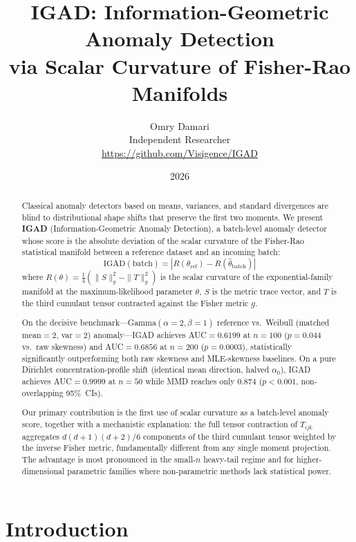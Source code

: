 \documentclass[12pt]{article}
\title{IGAD: Information-Geometric Anomaly Detection\\
       via Scalar Curvature of Fisher-Rao Manifolds}
\author{Omry Damari\\
        Independent Researcher\\
        \href{https://github.com/Visigence/IGAD}{https://github.com/Visigence/IGAD}}
\date{2026}
\begin{document}
\maketitle

\begin{abstract}
Classical anomaly detectors based on means, variances, and standard divergences
are blind to distributional shape shifts that preserve the first two moments.
We present \textbf{IGAD} (Information-Geometric Anomaly Detection), a
batch-level anomaly detector whose score is the absolute deviation of the scalar
curvature of the Fisher-Rao statistical manifold between a reference dataset and
an incoming batch:
\[
  \mathrm{IGAD}(\text{batch}) = |R(\theta_{\mathrm{ref}}) - R(\hat{\theta}_{\mathrm{batch}})|
\]
where $R(\theta) = \tfrac{1}{4}(\|S\|^2_g - \|T\|^2_g)$ is the scalar curvature
of the exponential-family manifold at the maximum-likelihood parameter $\theta$,
$S$ is the metric trace vector, and $T$ is the third cumulant tensor contracted
against the Fisher metric $g$.

On the decisive benchmark---Gamma$(\alpha{=}2,\beta{=}1)$ reference vs.\
Weibull (matched mean$=2$, var$=2$) anomaly---IGAD achieves AUC$=0.6199$ at
$n=100$ ($p=0.044$ vs.\ raw skewness) and AUC$=0.6856$ at $n=200$
($p=0.0003$), statistically significantly outperforming both raw skewness and
MLE-skewness baselines. On a pure Dirichlet concentration-profile shift
(identical mean direction, halved $\alpha_0$), IGAD achieves AUC$=0.9999$ at
$n=50$ while MMD reaches only $0.874$ ($p<0.001$, non-overlapping 95\%~CIs).

Our primary contribution is the first use of scalar curvature as a batch-level
anomaly score, together with a mechanistic explanation: the full tensor
contraction of $T_{ijk}$ aggregates $d(d+1)(d+2)/6$ components of the third
cumulant tensor weighted by the inverse Fisher metric, fundamentally different
from any single moment projection. The advantage is most pronounced in the
small-$n$ heavy-tail regime and for higher-dimensional parametric families where
non-parametric methods lack statistical power.
\end{abstract}

\tableofcontents
\newpage

\section{Introduction}
\end{document}
